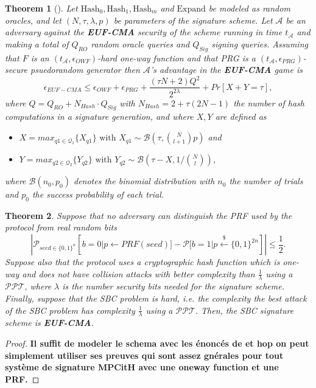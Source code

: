 \documentclass[english]{article}
\newtheorem{theorem}{Theorem}[section]
\begin{document}
	\begin{theorem}[\cite{feneu2023}]
		Let $\text{Hash}_0, \text{Hash}_1, \text{Hash}_m$ and $\text{Expand}$ be modeled as random oracles, and let $(N, \tau, \lambda, p)$ be parameters of the signature scheme. Let $\mathcal{A}$ be an adversary against the \textbf{EUF-CMA} security of the scheme running in time $t_{\mathcal{A}}$ and making a total of $Q_{RO}$ random oracle queries and $Q_{Sig}$ signing queries. Assuming that $F$ is an $(t_{\mathcal{A}}, \epsilon_{OWF})$-hard one-way function and that PRG is a $(t_{\mathcal{A}}, \epsilon_{PRG})$-secure psuedorandom generator then $\mathcal{A}$'s advantage in the \textbf{EUF-CMA} game is
		$$
			\epsilon_{EUF-CMA} \leq \epsilon_{OWF} + \epsilon_{PRG} + \frac{(\tau N + 2)Q^2}{2^{2\lambda}} + Pr[X+Y = \tau],
		$$
		where $Q = Q_{RO} + N_{Hash} \cdot Q_{Sig}$ with $N_{Hash} = 2 + \tau(2N - 1)$ the number of hash computations in a signature generation, and where $X, Y$ are defined as
		\begin{itemize}
			\item $X = max_{q1 \in \mathcal{Q}_1} \{X_{q1}\} \text{ with } X_{q1} \sim \mathcal{B}\left(\tau, \binom{N}{l+1}p\right)$ and
			\item $Y = max_{q2 \in \mathcal{Q}_2} \{Y_{q2}\} \text{ with } Y_{q2} \sim \mathcal{B}\left(\tau - X, 1 / \binom{N}{l}\right)$,
		\end{itemize}
		where $\mathcal{B}(n_0, p_0)$ denotes the binomial distribution with $n_0$ the number of trials and $p_0$ the success probability of each trial.
	\end{theorem}
	
	\begin{theorem}
		Suppose that no adversary can distinguish the PRF used by the protocol from real random bits
		$$
		| \mathcal{P}_{seed \in \{0,1\}^n}[b=0 | p \leftarrow PRF(seed)] - \mathcal{P}[b=1 | p \overset{{\scriptscriptstyle\$}}{\leftarrow} \{0,1\}^{2n}] | \leq \frac{1}{2}.
		$$
		Suppose also that the protocol uses a cryptographic hash function which is one-way and does not have collision attacks with better complexity than $\frac{1}{\lambda}$ using a $\mathcal{PPT}$, where $\lambda$ is the number security bits needed for the signature scheme.
		Finally, suppose that the SBC problem is hard, i.e. the complexity the best attack of the SBC problem has complexity $\frac{1}{\lambda}$ using a $\mathcal{PPT}$.
		Then, the SBC signature scheme is \textbf{EUF-CMA}.
	\end{theorem}
	\begin{proof}
		\textbf{Il suffit de modeler le schema avec les énoncés de \cite{feneu2023} et hop on peut simplement utiliser ses preuves qui sont assez gnérales pour tout système de signature MPCitH avec une oneway function et une PRF.}
		
	\end{proof}
\end{document}
